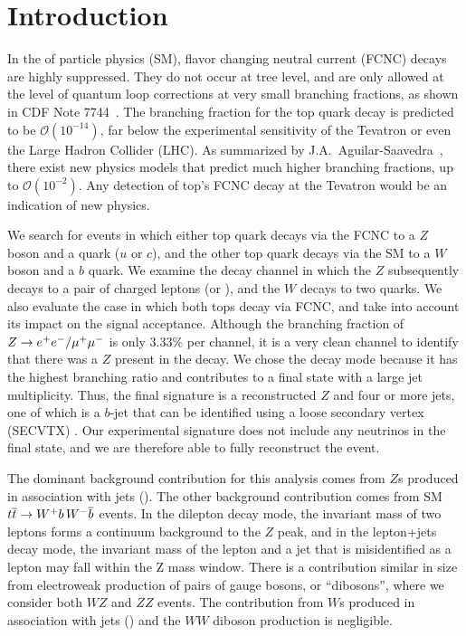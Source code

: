 \section{Introduction}
In the \sm of particle physics (SM), flavor changing
neutral current (FCNC) decays are highly suppressed. They
do not occur at tree level, and are only 
allowed at the level of quantum loop corrections at very 
small branching fractions, as shown in CDF Note 7744~\cite{CDF7744}. 
The branching fraction for the top quark decay \tZq is predicted 
to be $\mathcal{O}(10^{-14})$, far below the experimental sensitivity 
of the Tevatron or even the Large Hadron Collider (LHC). As summarized 
by J.A.\ Aguilar-Saavedra~\cite{Aguilar-Saavedra:2004wm}, there exist 
new physics models that predict much higher branching fractions, 
up to $\mathcal{O}(10^{-2})$. Any detection of top's FCNC decay at the 
Tevatron would be an indication of new physics. 

We search for \ttbar events in which either top quark decays via 
the FCNC to a $Z$ boson and a quark ($u$ or $c$), and
the other top quark decays via the SM to a $W$ boson and a $b$ quark.  We
examine the decay channel in which the $Z$ subsequently decays to a
pair of charged leptons (\ee or \mm), and the $W$ decays to two
quarks. We also evaluate the case in which both tops decay via FCNC, and
take into account its impact on the signal acceptance. Although the branching 
fraction of $Z\rightarrow{e^{+}e^{-}}/{\mu^{+}\mu^{-}}$ is only 3.33\% per channel, 
it is a very clean channel to identify that there was a $Z$ present in the 
decay. We chose the \Wqq decay mode because it has the highest branching 
ratio and contributes to a final state with a large jet multiplicity.  
Thus, the final signature is a reconstructed $Z$ and four or more jets, 
one of which is a $b$-jet that can be identified using a loose secondary vertex 
(SECVTX) \btag. Our experimental signature does not include any neutrinos in the
final state, and we are therefore able to fully reconstruct the event.

The dominant background contribution for this analysis comes from
$Z$s produced in association with jets (\Zj). The other 
background contribution comes from SM ${t\overline{t}}\to W^{+} b\, W^{-} \overline{b}$
events. In the dilepton decay mode, the invariant mass of two leptons
forms a continuum background to the $Z$ peak, and in the lepton+jets
decay mode, the invariant mass of the lepton and a jet that is
misidentified as a lepton may fall within the Z mass window.  There is
a contribution similar in size from electroweak production of pairs of
gauge bosons, or ``dibosons'', where we consider both $WZ$ and $ZZ$ events. 
The contribution from $W$s produced in association with jets (\Wj) and
the $WW$ diboson production is negligible.
